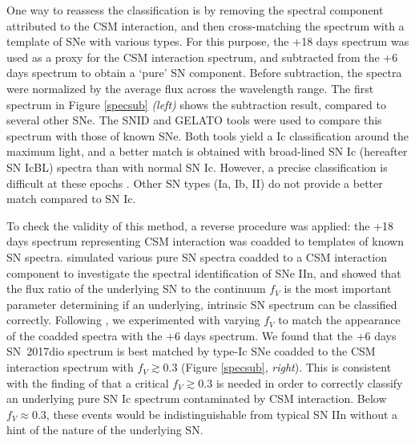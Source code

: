 \documentclass[twocolumn]{aastex61}
\begin{document}
One way to reassess the classification is by removing the spectral component attributed to the CSM interaction, and then cross-matching the spectrum with a template of SNe with various types. For this purpose, the +18 days spectrum was used as a proxy for the CSM interaction spectrum, and subtracted from the +6 days spectrum to obtain a `pure' SN component. 
Before subtraction, the spectra were normalized by the average flux across the wavelength range.
The first spectrum in Figure \ref{specsub} \textit{(left)} shows the subtraction result, {compared to several other SNe}.
The SNID \citep{blondin07} and GELATO \citep{harutyunyan08} tools were used to compare this spectrum with those of known SNe. Both tools yield a Ic classification around the maximum light, and {a} better match is obtained with broad-lined SN Ic {(hereafter SN IcBL)} spectra {than with} normal SN Ic. 
However, a precise classification is difficult at these epochs \citep{prentice17}.
{Other SN types (Ia, Ib, II) do not provide a better match compared to SN Ic.}

%

To check the validity of this method, a reverse procedure was applied: the +18 days spectrum representing CSM interaction was coadded to templates of known SN spectra. 
\citet{leloudas15} simulated various pure SN spectra coadded to a CSM interaction component to investigate the spectral identification of SNe IIn, and showed that the flux ratio of the underlying SN to the continuum $f_V$ is the most important parameter determining if an underlying, intrinsic SN spectrum can be classified correctly.
Following \citet{leloudas15}, we experimented with varying $f_V$ to match the appearance of the coadded spectra with the +6 days spectrum.  
We found that the +6 days SN~2017dio spectrum is best matched by type-Ic SNe coadded to the {CSM interaction spectrum with $f_V \gtrsim 0.3$} (Figure \ref{specsub}, \textit{right}).
This is consistent with the finding of \citet{leloudas15} that a critical $f_V \gtrsim 0.3$ is needed in order to correctly classify an underlying pure SN Ic spectrum contaminated by CSM interaction. Below $f_V \approx 0.3$, these events would be indistinguishable from typical SN IIn without a hint of the nature of the underlying SN. 
\end{document}
